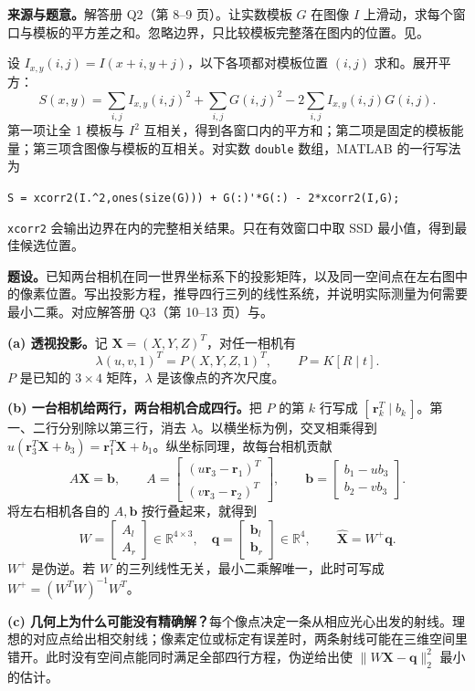 
\textbf{来源与题意。}解答册 Q2（第 8--9 页）。让实数模板 $G$ 在图像 $I$ 上滑动，求每个窗口与模板的平方差之和。忽略边界，只比较模板完整落在图内的位置。见。

\begin{checkedsolution}
设 $I_{x,y}(i,j)=I(x+i,y+j)$，以下各项都对模板位置 $(i,j)$ 求和。展开平方：
\[
 S(x,y)=\sum_{i,j} I_{x,y}(i,j)^2
       +\sum_{i,j}G(i,j)^2-2\sum_{i,j}I_{x,y}(i,j)G(i,j).
\]
第一项让全 1 模板与 $I^2$ 互相关，得到各窗口内的平方和；第二项是固定的模板能量；第三项含图像与模板的互相关。对实数 \texttt{double} 数组，MATLAB 的一行写法为
\begin{center}
{\small\verb|S = xcorr2(I.^2,ones(size(G))) + G(:)'*G(:) - 2*xcorr2(I,G);|}
\end{center}
\texttt{xcorr2} 会输出边界在内的完整相关结果。只在有效窗口中取 SSD 最小值，得到最佳候选位置。
\end{checkedsolution}


\textbf{题设。}已知两台相机在同一世界坐标系下的投影矩阵，以及同一空间点在左右图中的像素位置。写出投影方程，推导四行三列的线性系统，并说明实际测量为何需要最小二乘。对应解答册 Q3（第 10--13 页）与。

\begin{checkedsolution}
\textbf{(a) 透视投影。}记 $\bm X=(X,Y,Z)^T$，对任一相机有
\[
 \lambda (u,v,1)^T=P(X,Y,Z,1)^T,\qquad P=K[R\mid t].
\]
$P$ 是已知的 $3\times4$ 矩阵，$\lambda$ 是该像点的齐次尺度。

\textbf{(b) 一台相机给两行，两台相机合成四行。}把 $P$ 的第 $k$ 行写成 $[\,\bm r_k^T\mid b_k\,]$。第一、二行分别除以第三行，消去 $\lambda$。以横坐标为例，交叉相乘得到 $u(\bm r_3^T\bm X+b_3)=\bm r_1^T\bm X+b_1$。纵坐标同理，故每台相机贡献
\[
 A\bm X=\bm b,\qquad
 A=\begin{bmatrix}(u\bm r_3-\bm r_1)^T\\(v\bm r_3-\bm r_2)^T\end{bmatrix},
 \qquad \bm b=\begin{bmatrix}b_1-u b_3\\b_2-v b_3\end{bmatrix}.
\]
将左右相机各自的 $A,\bm b$ 按行叠起来，就得到
\[
 W=\begin{bmatrix}A_l\\A_r\end{bmatrix}\in\mathbb R^{4\times3},
 \quad \bm q=\begin{bmatrix}\bm b_l\\\bm b_r\end{bmatrix}\in\mathbb R^4,
 \qquad \boxed{\hat{\bm X}=W^+\bm q}.
\]
$W^+$ 是伪逆。若 $W$ 的三列线性无关，最小二乘解唯一，此时可写成 $W^+=(W^TW)^{-1}W^T$。

\textbf{(c) 几何上为什么可能没有精确解？}每个像点决定一条从相应光心出发的射线。理想的对应点给出相交射线；像素定位或标定有误差时，两条射线可能在三维空间里错开。此时没有空间点能同时满足全部四行方程，伪逆给出使 $\|W\bm X-\bm q\|_2^2$ 最小的估计。
\end{checkedsolution}
\endgroup
